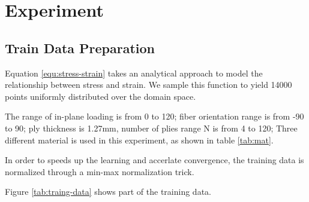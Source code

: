 \section{Experiment}
\subsection{Train Data Preparation}
Equation \ref{equ:stress-strain} takes an analytical approach to model the
relationship between stress and strain. We sample this function to yield 14000 points
uniformly distributed over the domain space.

The range of in-plane loading is from 0 to 120; fiber orientation range is from
-90 to 90; ply thickness is 1.27mm, number of plies range N is from 4 to 120;
Three different material is used in this experiment, as shown in table \ref{tab:mat}.

In order to speeds up the learning and accerlate convergence, the
training data is normalized through a min-max normalization trick.



Figure \ref{tab:traing-data} shows part of the training data.








